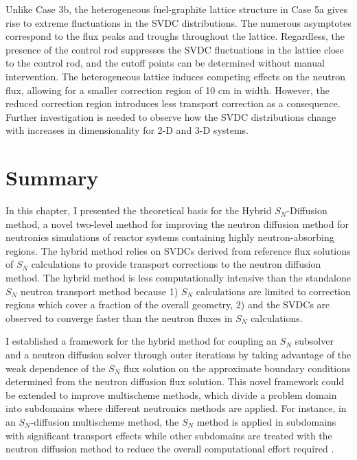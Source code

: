 Unlike Case 3b, the heterogeneous fuel-graphite lattice structure in Case 5a gives rise to
extreme fluctuations in the \gls{SVDC} distributions. The numerous asymptotes correspond to the
flux peaks and troughs throughout the lattice. Regardless, the presence of the control rod
suppresses the \gls{SVDC} fluctuations in the lattice close to the control rod, and the cutoff
points can be determined without manual intervention. The heterogeneous lattice induces competing
effects on the neutron flux, allowing for a smaller correction region of 10 cm in width. However,
the reduced correction region introduces less transport correction as a consequence.
Further investigation is needed to observe how the \gls{SVDC} distributions change with
increases in dimensionality for 2-D and 3-D systems.

\section{Summary} \label{sec:hybrid-summary}

In this chapter, I presented the theoretical basis for the Hybrid $S_N$-Diffusion method, a novel
two-level method for improving the neutron diffusion method for neutronics simulations of reactor
systems containing highly neutron-absorbing regions. The hybrid method relies on \glspl{SVDC}
derived from reference flux solutions of $S_N$ calculations to provide transport
corrections to the neutron diffusion method. The hybrid method is less computationally intensive
than the standalone $S_N$ neutron transport method because 1) $S_N$ calculations are limited to
correction regions which cover a fraction of the overall geometry, 2) and the \glspl{SVDC} are
observed to converge faster than the neutron fluxes in $S_N$ calculations.

I established a framework for the hybrid method for coupling an $S_N$ subsolver and a neutron
diffusion solver through outer iterations by taking advantage of the weak dependence of the $S_N$
flux solution on the approximate boundary conditions determined from the neutron diffusion flux
solution. This novel framework could be extended to improve multischeme methods, which
divide a problem domain into subdomains where different neutronics methods are applied. For
instance, in an $S_N$-diffusion multischeme method, the $S_N$ method is applied in subdomains with
significant transport effects while other subdomains are treated with the neutron diffusion method
to reduce the overall computational effort required \cite{wang_rattlesnake_2021}. 

